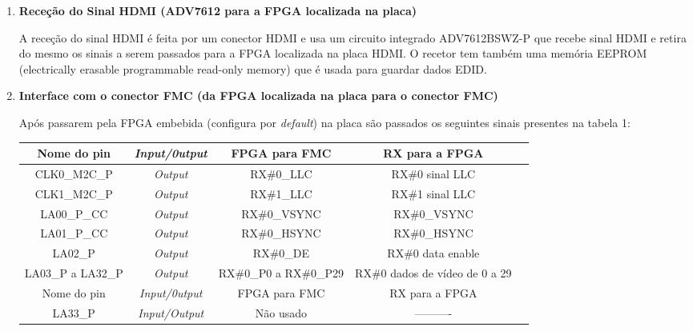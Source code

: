 \begin{enumerate}
	\item \textbf{Receção do Sinal HDMI (ADV7612 para a FPGA localizada na placa)}
	
	A receção do sinal HDMI é feita por um conector HDMI e usa um circuito integrado ADV7612BSWZ-P que recebe sinal HDMI e retira do mesmo os sinais a serem passados para a FPGA localizada na placa HDMI. O recetor tem também uma memória EEPROM (electrically erasable programmable read-only memory) que é usada para guardar dados EDID.
	\item \textbf{Interface com o conector FMC (da FPGA localizada na placa para o conector FMC)}
	
	Após passarem pela FPGA embebida (configura por \textit{default}) na placa são passados os seguintes sinais presentes na tabela 1:
\begin{table}[h!]
	\centering
	\begin{tabular}{|c|c|c|c|l}
		\hline
		\textbf{Nome do pin} & \textit{\textbf{Input/0utput}} & \textbf{FPGA para FMC} & \textbf{RX para a FPGA}        & \textbf{} \\ \hline
		CLK0\_M2C\_P         & \textit{Output}                & RX\#0\_LLC             & RX\#0 sinal LLC                &           \\ \cline{1-4}
		CLK1\_M2C\_P         & \textit{Output}                & RX\#1\_LLC             & RX\#1 sinal LLC                &           \\ \cline{1-4}
		LA00\_P\_CC          & \textit{Output}                & RX\#0\_VSYNC           & RX\#0\_VSYNC                   &           \\ \cline{1-4}
		LA01\_P\_CC          & \textit{Output}                & RX\#0\_HSYNC           & RX\#0\_HSYNC                   &           \\ \cline{1-4}
		LA02\_P              & \textit{Output}                & RX\#0\_DE              & RX\#0 data enable              &           \\ \cline{1-4}
		LA03\_P a LA32\_P    & \textit{Output}                & RX\#0\_P0 a RX\#0\_P29 & RX\#0 dados de vídeo de 0 a 29 &           \\ \cline{1-4}
		Nome do pin          & \textit{Input/0utput}          & FPGA para FMC          & RX para a FPGA                 &           \\ \cline{1-4}
		LA33\_P              & \textit{Input/Output}          & Não usado              & ----------                     &           \\ \cline{1-4}

\end{tabular}
\end{table}
\end{enumerate}
